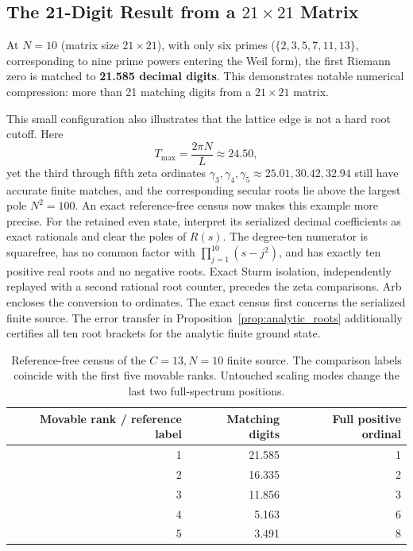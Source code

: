\documentclass[11pt,a4paper]{article}
\begin{document}
\subsection{\texorpdfstring{The 21-Digit Result from a $21\times 21$ Matrix}
{The 21-Digit Result from a 21 x 21 Matrix}}

At $N=10$ (matrix size $21\times21$), with only six primes
($\{2,3,5,7,11,13\}$, corresponding to nine prime powers entering
the Weil form), the first Riemann zero is matched to
\textbf{21.585 decimal digits}. This demonstrates notable numerical
compression: more than 21 matching digits from a $21\times21$ matrix.

This small configuration also illustrates that the lattice edge is not
a hard root cutoff. Here
\[
T_{\max}=\frac{2\pi N}{L}\approx24.50,
\]
yet the third through fifth zeta ordinates
$\gamma_3,\gamma_4,\gamma_5\approx25.01,30.42,32.94$ still have
accurate finite matches, and the corresponding secular roots lie above
the largest pole $N^2=100$. An exact reference-free census now makes this example more precise.
For the retained even state, interpret its serialized decimal
coefficients as exact rationals and clear the poles of $R(s)$.
The degree-ten numerator is squarefree, has no common factor with
$\prod_{j=1}^{10}(s-j^2)$, and has exactly ten positive real roots and
no negative roots. Exact Sturm isolation, independently replayed with
a second rational root counter, precedes the zeta comparisons.
Arb encloses the conversion to ordinates. The exact census first concerns the serialized finite source.
The error transfer in Proposition~\ref{prop:analytic_roots} additionally
certifies all ten root brackets for the analytic finite ground state.

\begin{table}[!htbp]
\centering
\caption{Reference-free census of the $C=13,N=10$ finite source.
The comparison labels coincide with the first five movable ranks.
Untouched scaling modes change the last two full-spectrum positions.}
\label{tab:small_census}
\begin{tabular}{@{}rrr@{}}
\toprule
Movable rank / reference label & Matching digits & Full positive ordinal \\
\midrule
1 & 21.585 & 1 \\
2 & 16.335 & 2 \\
3 & 11.856 & 3 \\
4 & 5.163 & 6 \\
5 & 3.491 & 8 \\
\bottomrule
\end{tabular}
\end{table}
\end{document}
